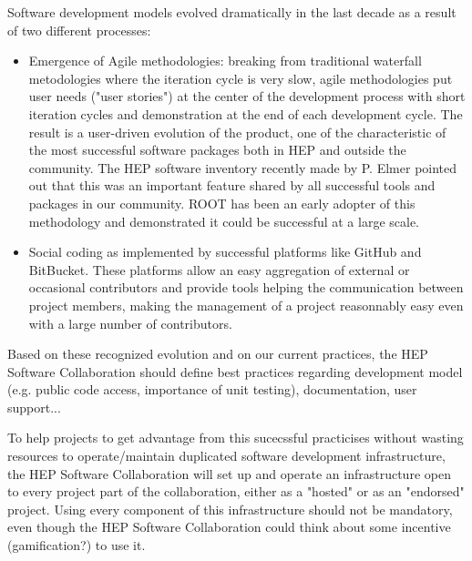 \documentclass[11pt]{article} %
\begin{document}
Software development models evolved dramatically in the last decade as
a result of two different processes:

\begin{itemize}
\item 
Emergence of Agile methodologies: breaking from traditional
waterfall metodologies where the iteration cycle is very slow, agile
methodologies put user needs ("user stories") at the center of the
development process with short iteration cycles and demonstration
at the end of each development cycle.
The result is a user-driven evolution of the product, one of the
characteristic of the most successful software packages both in HEP
and outside the community. 
The HEP software inventory recently made by P. Elmer pointed out that
this was an important feature shared by all successful tools and
packages in our community.
ROOT has been an early adopter of this methodology and demonstrated
it could be successful at a large scale.

\item 
Social coding as implemented by successful platforms like GitHub and
BitBucket.
These platforms allow an easy aggregation of external or occasional
contributors and provide tools helping the communication between
project members, making the management of a project reasonnably
easy even with a large number of contributors.

\end{itemize}

Based on these recognized evolution and on our current practices, the HEP Software Collaboration should define
best practices regarding development model (e.g. public code access, importance of unit testing), documentation, user support...

To help projects to get advantage from this sucecssful practicises without wasting resources to
operate/maintain duplicated software development infrastructure, the HEP Software Collaboration will
set up and operate an infrastructure open to every project part of the collaboration, either as a
"hosted" or as an "endorsed" project. Using every component of this infrastructure should not be mandatory,
even though the HEP Software Collaboration could think about some incentive (gamification?) to use it.  
\end{document}
